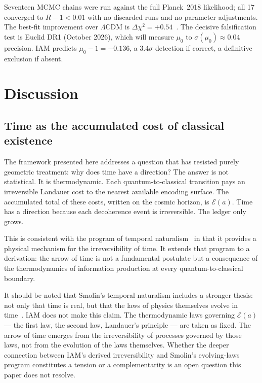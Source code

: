 \documentclass[12pt,a4paper]{article}
\begin{document}
Seventeen MCMC chains were run against the full Planck~2018 likelihood;
all 17 converged to $R-1 < 0.01$ with no discarded runs and no parameter
adjustments. The best-fit improvement over $\Lambda$CDM is
$\Delta\chi^2 = +0.54$~\citep{IAM_obs}. The decisive falsification test
is Euclid DR1 (October 2026), which will measure $\mu_0$ to
$\sigma(\mu_0) \approx 0.04$ precision. IAM predicts
$\mu_0 - 1 = -0.136$, a $3.4\sigma$ detection if correct, a definitive
exclusion if absent.

\section{Discussion}
\label{sec:discussion}

\subsection{Time as the accumulated cost of classical existence}

The framework presented here addresses a question that has resisted purely
geometric treatment: why does time have a direction? The answer is not
statistical. It is thermodynamic. Each quantum-to-classical transition
pays an irreversible Landauer cost to the nearest available encoding
surface. The accumulated total of these costs, written on the cosmic
horizon, is $\mathcal{E}(a)$. Time has a direction because each
decoherence event is irreversible. The ledger only grows.

This is consistent with the program of temporal naturalism~\citep{Smolin2013}
in that it provides a physical mechanism for the irreversibility of time.
It extends that program to a derivation: the arrow of time is not a
fundamental postulate but a consequence of the thermodynamics of
information production at every quantum-to-classical boundary.

It should be noted that Smolin's temporal naturalism includes a stronger
thesis: not only that time is real, but that the laws of physics themselves
evolve in time~\citep{Smolin2013}. IAM does not make this claim. The
thermodynamic laws governing $\mathcal{E}(a)$ --- the first law, the second
law, Landauer's principle --- are taken as fixed. The arrow of time
emerges from the irreversibility of processes governed by those laws, not
from the evolution of the laws themselves. Whether the deeper connection
between IAM's derived irreversibility and Smolin's evolving-laws program
constitutes a tension or a complementarity is an open question this paper
does not resolve.
\end{document}

